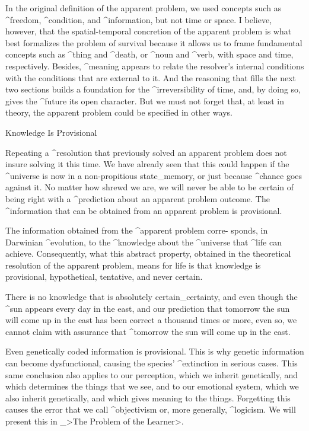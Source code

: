 In the original definition of the apparent problem, we used concepts
such as ^{freedom}, ^{condition}, and ^{information}, but not time or
space. I believe, however, that the spatial-temporal concretion of the
apparent problem is what best formalizes the problem of survival because
it allows us to frame fundamental concepts such as ^{thing} and
^{death}, or ^{noun} and ^{verb}, with space and time, respectively.
Besides, ^{meaning} appears to relate the resolver's internal conditions
with the conditions that are external to it. And the reasoning that
fills the next two sections builds a foundation for the
^{irreversibility} of time, and, by doing so, gives the ^{future} its
open character. But we must not forget that, at least in theory, the
apparent problem could be specified in other ways.


\Section Knowledge Is Provisional

Repeating a ^{resolution} that previously solved an apparent problem
does not insure solving it this time. We have already seen that this
could happen if the ^{universe} is now in a non-propitious
state_{memory}, or just because ^{chance} goes against it. No matter how
shrewd we are, we will never be able to be certain of being right with a
^{prediction} about an apparent problem outcome. The ^{information} that
can be obtained from an apparent problem is provisional.

The information obtained from the ^{apparent problem} corre-\break
sponds, in Darwinian ^{evolution}, to the ^{knowledge} about the
^{universe} that ^{life} can achieve. Consequently, what this abstract
property, \hbox{obtained} in the theoretical resolution of the apparent %
problem, means for life is that knowledge is provisional, hypothetical,
tentative, and never certain.

There is no knowledge that is absolutely certain_{certainty}, and even
though the ^{sun} appears every day in the east, and our prediction that
tomorrow the sun will come up in the east has been correct a thousand
times or more, even so, we cannot claim with assurance that ^{tomorrow}
the sun will come up in the east.

Even genetically coded information is provisional. This is why genetic
information can become dysfunctional, causing the species' ^{extinction}
in serious cases. This same conclusion also applies to our perception,
which we inherit genetically, and which determines the things that we
see, and to our emotional system, which we also inherit genetically, and
which gives meaning to the things. Forgetting this causes the error that
we call ^{objectivism} or, more generally, ^{logicism}. We will present
this in _>The Problem of the Learner>.


